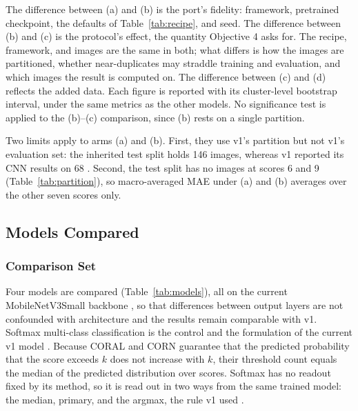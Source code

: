\documentclass{icsthesis}
\begin{document}
\begin{mainmatter}
					The difference between (a) and (b) is the port's fidelity: framework, pretrained checkpoint, the defaults of Table~\ref{tab:recipe}, and seed. The difference between (b) and (c) is the protocol's effect, the
					quantity Objective 4 asks for. The recipe, framework, and images are the same in
					both; what differs is how the images are partitioned, whether near-duplicates
					may straddle training and evaluation, and which images the result is computed
					on. The difference between (c) and (d) reflects the added data. Each figure is
					reported with its cluster-level bootstrap interval, under the same metrics as
					the other models. No significance test is applied to the (b)--(c) comparison,
					since (b) rests on a single partition.

					Two limits apply to arms (a) and (b). First, they use v1's partition
					but not v1's evaluation set: the inherited test split holds 146
					images, whereas v1 reported its CNN results on 68
					\citep{casasola2026}. Second, the test split has no images at scores
					6 and 9 (Table~\ref{tab:partition}), so macro-averaged MAE under (a)
					and (b) averages over the other seven scores only.

			\subsection{Models Compared}\label{sec:models}

				\subsubsection{Comparison Set}\label{sec:compset}

					Four models are compared (Table~\ref{tab:models}), all on the current MobileNetV3Small backbone
					\citep{howard2019}, so that differences between output layers are not confounded with architecture
					and the results remain comparable with v1. Softmax multi-class classification is the control and the
					formulation of the current v1 model \citep{casasola2026}. Because CORAL and CORN guarantee that the
					predicted probability that the score exceeds $k$ does not increase with $k$, their threshold count
					equals the median of the predicted distribution over scores. Softmax has no readout fixed by its
					method, so it is read out in two ways from the same trained model: the median, primary, and the
					argmax, the rule v1 used \citep{casasola2026}.


\end{mainmatter}
\end{document}
